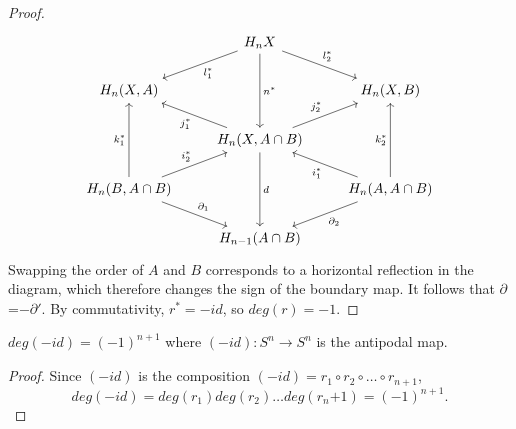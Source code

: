 \begin{proof}
\[\begin{tikzcd}
                                                                                  & H_n X \arrow[ld, "l_1^*"] \arrow[rd, "l_2^*"] \arrow[dd, "n^*"]          &                                                                                   \\
{H_n(X,A)}                                                                        &                                                                          & {H_n(X,B)}                                                                        \\
                                                                                  & {H_n(X,A\cap B)} \arrow[ru, "j_2^*"] \arrow[lu, "j_1^*"] \arrow[dd, "d"] &                                                                                   \\
{H_n(B,A\cap B)} \arrow[uu, "k_1^*"] \arrow[ru, "i_2^*"] \arrow[rd, "\partial_1"] &                                                                          & {H_n(A,A\cap B)} \arrow[uu, "k_2^*"] \arrow[lu, "i_1^*"] \arrow[ld, "\partial_2"] \\
                                                                                  & H_{n-1}(A\cap B)                                                         &                                                                                  
\end{tikzcd}\] Swapping the order of $A$ and $B$ corresponds to a horizontal reflection in the diagram, which therefore changes the sign of the boundary map. It follows that $\partial$=$-\partial'$. By commutativity, $r^*=-id$, so $deg(r)=-1$.

\end{proof}

\begin{corollary}\label{antipodal-degree}
$deg(-id)=(-1)^{n+1}$ where $(-id):S^n\rightarrow S^n$ is the antipodal map.
\end{corollary}
\begin{proof}
Since $(-id)$ is the composition $(-id)=r_1\circ r_2 \circ \dots \circ r_{n+1}$, $$deg(-id)=deg(r_1)deg(r_2)\dots deg(r_n{+1})=(-1)^{n+1}.$$
\cite{Hatcher}
\end{proof}

